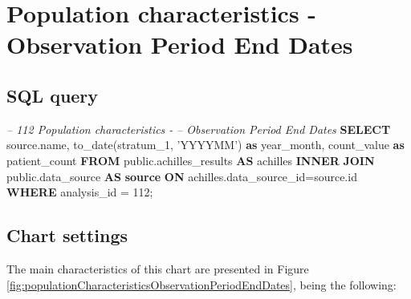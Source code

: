 \documentclass[]{book}
\newenvironment{Shaded}{\begin{snugshade}}{\end{snugshade}}
\newcommand{\KeywordTok}[1]{\textcolor[rgb]{0.13,0.29,0.53}{\textbf{#1}}}
\newcommand{\DecValTok}[1]{\textcolor[rgb]{0.00,0.00,0.81}{#1}}
\newcommand{\StringTok}[1]{\textcolor[rgb]{0.31,0.60,0.02}{#1}}
\newcommand{\CommentTok}[1]{\textcolor[rgb]{0.56,0.35,0.01}{\textit{#1}}}
\newcommand{\FunctionTok}[1]{\textcolor[rgb]{0.00,0.00,0.00}{#1}}
\newcommand{\NormalTok}[1]{#1}
\begin{document}
\section{Population characteristics - Observation Period End
Dates}\label{population-characteristics---observation-period-end-dates}

\subsection{SQL query}\label{sql-query-11}

\begin{Shaded}
\begin{Highlighting}[]
\CommentTok{-- 112  Population characteristics - }
\CommentTok{--      Observation Period End Dates}
\KeywordTok{SELECT}\NormalTok{ source.name,}
       \FunctionTok{to_date}\NormalTok{(stratum_1, }\StringTok{'YYYYMM'}\NormalTok{) }\KeywordTok{as}\NormalTok{ year_month,}
\NormalTok{       count_value }\KeywordTok{as}\NormalTok{ patient_count}
\KeywordTok{FROM}\NormalTok{ public.achilles_results }\KeywordTok{AS}\NormalTok{ achilles }
    \KeywordTok{INNER} \KeywordTok{JOIN}\NormalTok{ public.data_source }\KeywordTok{AS} \KeywordTok{source} \KeywordTok{ON} 
\NormalTok{      achilles.data_source_id=source.id}
\KeywordTok{WHERE}\NormalTok{ analysis_id = }\DecValTok{112}\NormalTok{;}
\end{Highlighting}
\end{Shaded}

\subsection{Chart settings}\label{chart-settings-11}

The main characteristics of this chart are presented in Figure
\ref{fig:populationCharacteristicsObservationPeriodEndDates}, being the
following:
\end{document}
